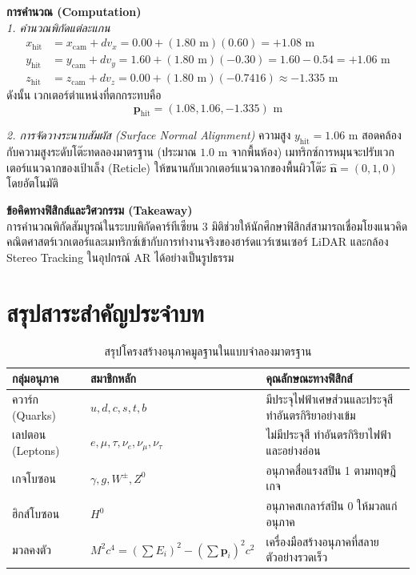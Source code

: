 \begin{psctexample}
\textbf{การคำนวณ (Computation)} \\
\textit{1. คำนวณพิกัดแต่ละแกน}
\begin{align}
x_{\text{hit}} &= x_{\text{cam}} + d v_x = 0.00 + (1.80\text{ m}) (0.60) = +1.08\text{ m} \nonumber \\
y_{\text{hit}} &= y_{\text{cam}} + d v_y = 1.60 + (1.80\text{ m}) (-0.30) = 1.60 - 0.54 = +1.06\text{ m} \nonumber \\
z_{\text{hit}} &= z_{\text{cam}} + d v_z = 0.00 + (1.80\text{ m}) (-0.7416) \approx -1.335\text{ m}
\end{align}
ดังนั้น เวกเตอร์ตำแหน่งที่ตกกระทบคือ
\begin{equation}
\mathbf{p}_{\text{hit}} = (1.08, 1.06, -1.335)\text{ m}
\end{equation}

\textit{2. การจัดวางระนาบสัมผัส (Surface Normal Alignment)}
ความสูง $y_{\text{hit}} = 1.06\text{ m}$ สอดคล้องกับความสูงระดับโต๊ะทดลองมาตรฐาน (ประมาณ $1.0\text{ m}$ จากพื้นห้อง) เมทริกซ์การหมุนจะปรับเวกเตอร์แนวฉากของเป้าเล็ง (Reticle) ให้ขนานกับเวกเตอร์แนวฉากของพื้นผิวโต๊ะ $\hat{\mathbf{n}} = (0, 1, 0)$ โดยอัตโนมัติ

\textbf{ข้อคิดทางฟิสิกส์และวิศวกรรม (Takeaway)} \\
การคำนวณพิกัดสัมบูรณ์ในระบบพิกัดคาร์ทีเซียน 3 มิติช่วยให้นักศึกษาฟิสิกส์สามารถเชื่อมโยงแนวคิดคณิตศาสตร์เวกเตอร์และเมทริกซ์เข้ากับการทำงานจริงของฮาร์ดแวร์เซนเซอร์ LiDAR และกล้อง Stereo Tracking ในอุปกรณ์ AR ได้อย่างเป็นรูปธรรม
\qedexam
\end{psctexample}

\section{สรุปสาระสำคัญประจำบท}

\begin{table}[H]
\centering
\small
\begin{tabularx}{\textwidth}{l >{\centering\arraybackslash}p{4.2cm} Y}
\toprule
\textbf{กลุ่มอนุภาค} & \textbf{สมาชิกหลัก} & \textbf{คุณลักษณะทางฟิสิกส์} \\
\midrule
ควาร์ก (Quarks) & $u, d, c, s, t, b$ & มีประจุไฟฟ้าเศษส่วนและประจุสี ทำอันตรกิริยาอย่างเข้ม \\
เลปตอน (Leptons) & $e, \mu, \tau, \nu_e, \nu_\mu, \nu_\tau$ & ไม่มีประจุสี ทำอันตรกิริยาไฟฟ้าและอย่างอ่อน \\
เกจโบซอน & $\gamma, g, W^\pm, Z^0$ & อนุภาคสื่อแรงสปิน 1 ตามทฤษฎีเกจ \\
ฮิกส์โบซอน & $H^0$ & อนุภาคสเกลาร์สปิน 0 ให้มวลแก่อนุภาค \\
มวลคงตัว & $M^2 c^4 = (\sum E_i)^2 - (\sum \mathbf{p}_i)^2 c^2$ & เครื่องมือสร้างอนุภาคที่สลายตัวอย่างรวดเร็ว \\
\bottomrule
\end{tabularx}
\caption{สรุปโครงสร้างอนุภาคมูลฐานในแบบจำลองมาตรฐาน}
\label{tab:standard_model_summary}
\end{table}

